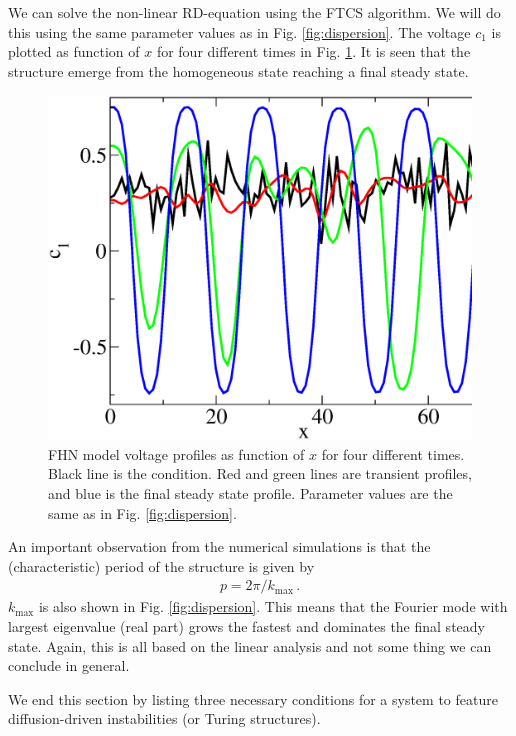 We can solve the non-linear RD-equation using the FTCS algorithm. We will do this using 
the same parameter values as in
Fig. \ref{fig:dispersion}. The voltage $c_1$ is plotted as function of $x$ for four different times 
in Fig. \ref{fig:turingfhn}. It is seen that the structure emerge from the homogeneous state reaching a 
final steady state. 
\begin{figure}
  \begin{center}
    \includegraphics[scale=.3]{figs/turingfhn}
    \caption{
		\label{fig:turingfhn} 
		FHN model voltage profiles as function of $x$ for four different times. 
		Black line is the condition. Red and green lines are 
		transient profiles, and blue is the final steady state profile. 
		Parameter values are the same as in Fig. \ref{fig:dispersion}.
    }
  \end{center}
\end{figure}
An important observation from the numerical simulations is that the (characteristic) period of the 
structure is given by
\begin{eqnarray}
	p = 2\pi/k_\text{max} \, .
\end{eqnarray}
$k_\text{max}$ is also shown in Fig. \ref{fig:dispersion}. This means that the Fourier mode with largest 
eigenvalue (real part) grows the fastest and dominates the final steady state. 
Again, this is all based on the linear analysis and not some thing we can conclude in general. 

We end this section by listing three necessary conditions for a system to feature 
diffusion-driven instabilities (or Turing structures). 


